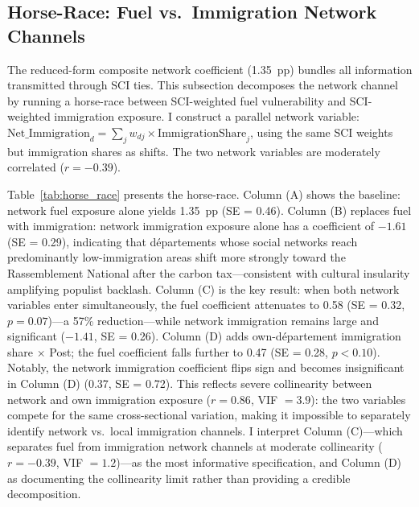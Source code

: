 \documentclass[12pt]{article}
\newcommand{\rn}{Rassemblement National}
\newcommand{\dept}{d\'{e}partement}
\newcommand{\depts}{d\'{e}partements}
\begin{document}
\subsection{Horse-Race: Fuel vs.\ Immigration Network Channels}
\label{sec:horse_race}

The reduced-form composite network coefficient (1.35~pp) bundles all information transmitted through SCI ties. This subsection decomposes the network channel by running a horse-race between SCI-weighted fuel vulnerability and SCI-weighted immigration exposure. I construct a parallel network variable: $\text{Net\_Immigration}_d = \sum_j w_{dj} \times \text{ImmigrationShare}_j$, using the same SCI weights but immigration shares as shifts. The two network variables are moderately correlated ($r = -0.39$).

Table~\ref{tab:horse_race} presents the horse-race. Column (A) shows the baseline: network fuel exposure alone yields 1.35~pp (SE = 0.46). Column (B) replaces fuel with immigration: network immigration exposure alone has a coefficient of $-1.61$ (SE = 0.29), indicating that \depts{} whose social networks reach predominantly low-immigration areas shift more strongly toward the \rn{} after the carbon tax---consistent with cultural insularity amplifying populist backlash. Column (C) is the key result: when both network variables enter simultaneously, the fuel coefficient attenuates to 0.58 (SE = 0.32, $p = 0.07$)---a 57\% reduction---while network immigration remains large and significant ($-1.41$, SE = 0.26). Column (D) adds own-\dept{} immigration share $\times$ Post; the fuel coefficient falls further to 0.47 (SE = 0.28, $p < 0.10$). Notably, the network immigration coefficient flips sign and becomes insignificant in Column (D) (0.37, SE = 0.72). This reflects severe collinearity between network and own immigration exposure ($r = 0.86$, VIF $= 3.9$): the two variables compete for the same cross-sectional variation, making it impossible to separately identify network vs.\ local immigration channels. I interpret Column (C)---which separates fuel from immigration network channels at moderate collinearity ($r = -0.39$, VIF $= 1.2$)---as the most informative specification, and Column (D) as documenting the collinearity limit rather than providing a credible decomposition.


\end{document}
